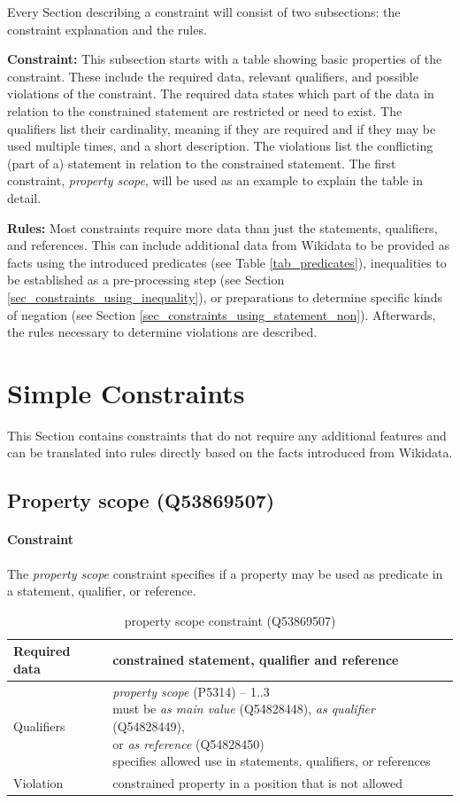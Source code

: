 \documentclass[hyperref,bachelorofscience,fleqn]{cgvpub}
\begin{document}
Every Section describing a constraint will consist of two subsections: the constraint explanation and the rules.

{\bf Constraint:} This subsection starts with a table showing basic properties of the constraint. These include the required data, relevant qualifiers, and possible violations of the constraint. The required data states which part of the data in relation to the constrained statement are restricted or need to exist. The qualifiers list their cardinality, meaning if they are required and if they may be used multiple times, and a short description. The violations list the conflicting (part of a) statement in relation to the constrained statement. The first constraint, \emph{property scope}, will be used as an example to explain the table in detail.

{\bf Rules:} Most constraints require more data than just the statements, qualifiers, and references. This can include additional data from Wikidata to be provided as facts using the introduced predicates (see Table \ref{tab_predicates}), inequalities to be established as a pre-processing step (see Section \ref{sec_constraints_using_inequality}), or preparations to determine specific kinds of negation (see Section \ref{sec_constraints_using_statement_non}). Afterwards, the rules necessary to determine violations are described.

\section{Simple Constraints}\label{sec_simple_constraints}
This Section contains constraints that do not require any additional features and can be translated into rules directly based on the facts introduced from Wikidata.

\subsection{Property scope (Q53869507)}
\paragraph{Constraint}
The \emph{property scope} constraint specifies if a property may be used as predicate in a statement, qualifier, or reference.
\begin{table}[H]
\caption{property scope constraint (Q53869507)}
\begin{tabularx}{\textwidth}{ ll X}
\hline
Required data & constrained statement, qualifier and reference \\
\hline
Qualifiers & \makecell{\emph{property scope} (P5314) -- 1..3 \\ must be \emph{as main value} (Q54828448), \emph{as qualifier} (Q54828449), \\ or \emph{as reference} (Q54828450) \\ specifies allowed use in statements, qualifiers, or references} \\
\hline
Violation & constrained property in a position that is not allowed \\
\hline
\end{tabularx}
\end{table}
\end{document}

